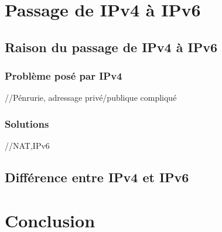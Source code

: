 \documentclass[twoside,openright,a4paper,11pt,french]{article}
\begin{document}
\section{Passage de IPv4 à IPv6}
\subsection{Raison du passage de IPv4 à IPv6}
\subsubsection{Problème posé par IPv4}
//Pénrurie, adressage privé/publique compliqué
\subsubsection{Solutions}
//NAT,IPv6
\subsection{Différence entre IPv4 et IPv6}

\section{Conclusion}
\label{sec:ccl}



\end{document}
